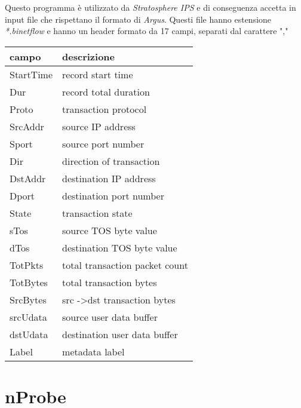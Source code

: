 \documentclass[../main.tex]{subfiles}
\begin{document}
Questo programma è utilizzato da \textit{Stratosphere IPS} e di conseguenza accetta in input file che rispettano il formato di \textit{Argus}. Questi file hanno estensione \textit{*.binetflow} e hanno un header formato da 17 campi, separati dal carattere ","
\begin{table}[H]
\begin{tabular}{|l|l|}
\hline
\textbf{campo} & \textbf{descrizione}                    \\ \hline
StartTime      & record start time                       \\ \hline
Dur            & record total duration                   \\ \hline
Proto          & transaction protocol                    \\ \hline
SrcAddr        & source IP address                       \\ \hline
Sport          & source port number                      \\ \hline
Dir            & direction of transaction                \\ \hline
DstAddr        & destination IP address                  \\ \hline
Dport          & destination port number                 \\ \hline
State          & transaction state                       \\ \hline
sTos           & source TOS byte value                   \\ \hline
dTos           & destination TOS byte value              \\ \hline
TotPkts        & total transaction packet count          \\ \hline
TotBytes       & total transaction bytes                 \\ \hline
SrcBytes       & src -\textgreater dst transaction bytes \\ \hline
srcUdata       & source user data buffer                 \\ \hline
dstUdata       & destination user data buffer            \\ \hline
Label          & metadata label                          \\ \hline
\end{tabular}
\end{table}

\section{nProbe}
\end{document}
